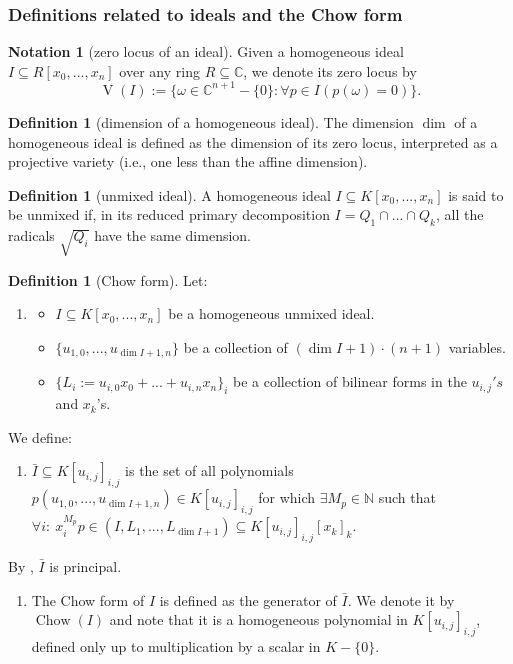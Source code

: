\documentclass[reqno]{amsart}
\theoremstyle{plain}
\theoremstyle{definition}
\newtheorem{Def}[Cor]{Definition}
\newtheorem{Notation}[Cor]{Notation}
\theoremstyle{remark}
\theoremstyle{plain}
\begin{document}
\subsubsection{Definitions related to ideals and the Chow form}

\begin{Notation}[zero locus of an ideal]
Given a homogeneous ideal $I\subseteq R[x_0,...,x_n]$ over any ring $R\subseteq\mathbb C$, we denote its zero locus by
\[
    \operatorname{V}(I):=\{\omega\in\mathbb C^{n+1}-\{0\}:\forall p\in I(p(\omega)=0)\}
.\]
\end{Notation}

\begin{Def}[dimension of a homogeneous ideal]
The dimension $\dim$ of a homogeneous ideal is defined as the dimension of its zero locus, interpreted as a projective variety (i.e., one less than the affine dimension).
\end{Def}

\begin{Def}[unmixed ideal]
 A homogeneous ideal $I\subseteq K[x_0,...,x_n]$ is said to be unmixed if, in its reduced primary decomposition $I=Q_1\cap...\cap Q_k$, all the radicals $\sqrt{Q_i}$ have the same dimension.
\end{Def}

\begin{Def}[Chow form]\label{Definition chow form}
Let:
\begin{enumerate}
\item
\begin{itemize}
    \item $I\subseteq K[x_0,...,x_n]$ be a homogeneous unmixed ideal.
    \item $\{u_{1,0},...,u_{\dim I+1,n}\}$ be a collection of $(\dim I+1)\cdot(n+1)$ variables.
    \item $\{L_i:=u_{i,0}x_0+...+u_{i,n}x_n\}_i$ be a collection of bilinear forms in the $u_{i,j}'s$ and $x_{k}$'s.
\end{itemize}
\end{enumerate}

We define:
\begin{enumerate}[resume]
    \item $\bar I\subseteq K[u_{i,j}]_{i,j}$ is the set of all polynomials $p(u_{1,0},...,u_{\dim I+1,n})\in K[u_{i,j}]_{i,j}$ for which $\exists M_p\in\mathbb N$ such that $\forall i:\ x_i^{M_p}p\in(I,L_1,...,L_{\dim I+1})\subseteq K[u_{i,j}]_{i,j}[x_k]_k$.
\end{enumerate}

By \cite[Lemma 5]{Nesterenko1977estimatesForTheOrdersOfZerosOfFunctionsOfACertainClassAndApplicationsInTheTheoryOfTranscendentalNumbers}, $\bar I$ is principal.
\begin{enumerate}[resume]
\item The Chow form of $I$ is defined as the generator of $\bar I$. We denote it by $\operatorname{Chow}(I)$ and note that it is a homogeneous polynomial in $K[u_{i,j}]_{i,j}$, defined only up to multiplication by a scalar in $K-\{0\}$.
\end{enumerate}
\end{Def}
\end{document}
